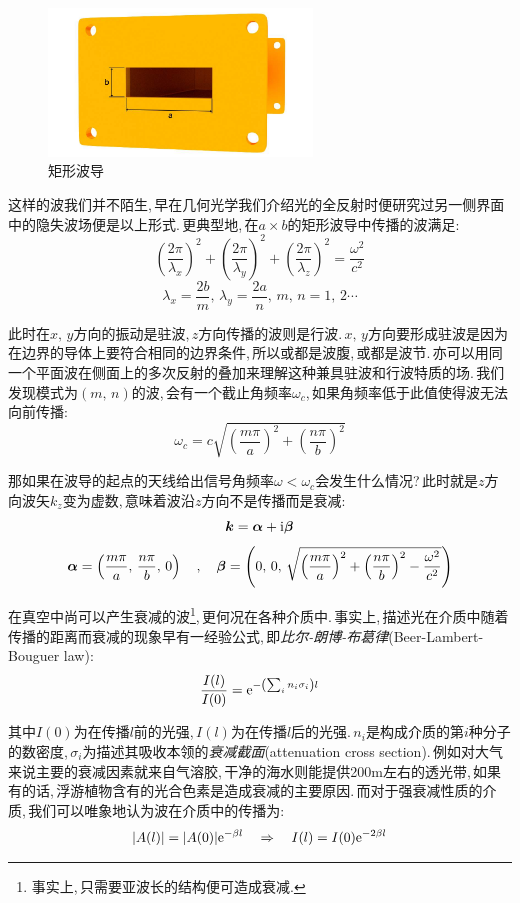 \begin{figure}
\centering
\includegraphics[width=7cm]{image/16-1-1.jpg}
\caption{矩形波导}
\end{figure}
这样的波我们并不陌生,\,早在几何光学我们介绍光的全反射时便研究过另一侧界面中的隐失波场便是以上形式.\,更典型地,\,在$a\times b$的矩形波导中传播的波满足:
\[(\frac{2\pi}{\lambda_x})^2+(\frac{2\pi}{\lambda_y})^2+(\frac{2\pi}{\lambda_z})^2=\frac{\omega^2}{c^2} \]
\[\lambda_x=\frac{2b}{m},\, \lambda_y=\frac{2a}{n},\,m,\,n=1,\,2\cdots\]

此时在$x,\,y$方向的振动是驻波,\,$z$方向传播的波则是行波.\,$x,\,y$方向要形成驻波是因为在边界的导体上要符合相同的边界条件,\,所以或都是波腹,\,或都是波节.\,亦可以用同一个平面波在侧面上的多次反射的叠加来理解这种兼具驻波和行波特质的场.\,我们发现模式为$(m,\,n)$的波,\,会有一个截止角频率$\omega_c$,\,如果角频率低于此值使得波无法向前传播:
\[\omega_c=c\sqrt{\left(\frac{m\pi}{a}\right)^2+\left(\frac{n\pi}{b}\right)^2}\]

那如果在波导的起点的天线给出信号角频率$\omega<\omega_c$会发生什么情况?\,此时就是$z$方向波矢$k_z$变为虚数,\,意味着波沿$z$方向不是传播而是衰减:
\[\boldsymbol{k}=\boldsymbol{\alpha}+{\rm i}\boldsymbol{\beta}\]
\[\boldsymbol{\alpha}=\left( \frac{m\pi}{a},\, \frac{n\pi}{b},\, 0\right)\quad,\quad\boldsymbol{\beta}=\left(0 ,\,0 ,\, \sqrt{\left(\frac{m\pi}{a}\right)^2+\left(\frac{n\pi}{b}\right)^2-\frac{\omega^2}{c^2}}\right)\]

在真空中尚可以产生衰减的波\footnote{事实上,\,只需要亚波长的结构便可造成衰减.},\,更何况在各种介质中.\,事实上,\,描述光在介质中随着传播的距离而衰减的现象早有一经验公式,\,即\emph{比尔-朗博-布葛律}(Beer-Lambert-Bouguer law):
\[\frac{I(l)}{I(0)}={\rm e}^{-\left(\sum_{i} n_i\sigma_i\right) l}\]

其中$I(0)$为在传播$l$前的光强,\,$I(l)$为在传播$l$后的光强.\,$n_i$是构成介质的第$i$种分子的数密度,\,$\sigma_i$为描述其吸收本领的\emph{衰减截面}(attenuation cross section).\,例如对大气来说主要的衰减因素就来自气溶胶,\,干净的海水则能提供200m左右的透光带,\,如果有的话,\,浮游植物含有的光合色素是造成衰减的主要原因.\,而对于强衰减性质的介质,\,我们可以唯象地认为波在介质中的传播为:
\[|A(l)|=|A(0)|{\rm e}^{-\beta l}\quad \Rightarrow\quad I(l)=I(0){\rm e}^{-2\beta l}\]

